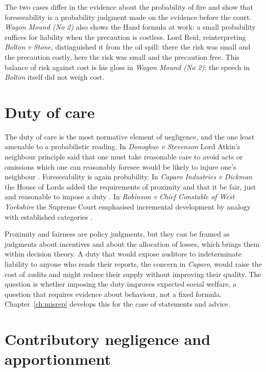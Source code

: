The two cases differ in the evidence about the probability of fire and show that foreseeability is a probability judgment made on the evidence before the court. \emph{Wagon Mound (No 2)} also shows the Hand formula at work: a small probability suffices for liability when the precaution is costless. Lord Reid, reinterpreting \emph{Bolton v Stone}, distinguished it from the oil spill: there the risk was small and the precaution costly, here the risk was small and the precaution free. This balance of risk against cost is his gloss in \emph{Wagon Mound (No 2)}; the speech in \emph{Bolton} itself did not weigh cost.

\section{Duty of care}

The duty of care is the most normative element of negligence, and the one least amenable to a probabilistic reading. In \emph{Donoghue v Stevenson} Lord Atkin's neighbour principle said that one must take reasonable care to avoid acts or omissions which one can reasonably foresee would be likely to injure one's neighbour \citep{donoghue1932}. Foreseeability is again probability. In \emph{Caparo Industries v Dickman} the House of Lords added the requirements of proximity and that it be fair, just and reasonable to impose a duty \citep{caparo1990}. In \emph{Robinson v Chief Constable of West Yorkshire} the Supreme Court emphasised incremental development by analogy with established categories \citep{robinson2018}.

Proximity and fairness are policy judgments, but they can be framed as judgments about incentives and about the allocation of losses, which brings them within decision theory. A duty that would expose auditors to indeterminate liability to anyone who reads their reports, the concern in \emph{Caparo}, would raise the cost of audits and might reduce their supply without improving their quality. The question is whether imposing the duty improves expected social welfare, a question that requires evidence about behaviour, not a fixed formula. Chapter~\ref{ch:misrep} develops this for the case of statements and advice.

\section{Contributory negligence and apportionment}

